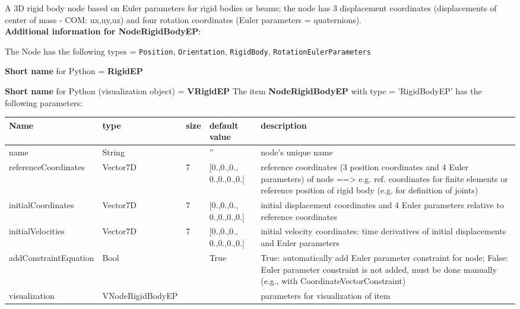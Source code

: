 \label{sec:item:NodeRigidBodyEP}
A 3D rigid body node based on Euler parameters for rigid bodies or beams; the node has 3 displacement coordinates (displacements of center of mass - COM: ux,uy,uz) and four rotation coordinates (Euler parameters = quaternions).\vspace{12pt}
 \\{\bf Additional information for NodeRigidBodyEP}:
\bi
  \item The Node has the following types = \texttt{Position}, \texttt{Orientation}, \texttt{RigidBody}, \texttt{RotationEulerParameters}
  \item {\bf Short name} for Python = {\bf RigidEP}  \item {\bf Short name} for Python (visualization object) = {\bf VRigidEP}\ei
\vspace{12pt} \noindent The item {\bf NodeRigidBodyEP} with type = 'RigidBodyEP' has the following parameters:\vspace{-1cm}\\ 
\begin{center}
  \footnotesize
  \begin{longtable}{| p{4.5cm} | p{2.5cm} | p{0.5cm} | p{2.5cm} | p{6cm} |}
    \hline
    \bf Name & \bf type & \bf size & \bf default value & \bf description \\ \hline
    name &     String &      &     '' &     node's unique name\\ \hline
    referenceCoordinates &     Vector7D &     7 &     [0.,0.,0., 0.,0.,0.,0.] &     reference coordinates (3 position coordinates and 4 Euler parameters) of node ==> e.g. ref. coordinates for finite elements or reference position of rigid body (e.g. for definition of joints)\\ \hline
    initialCoordinates &     Vector7D &     7 &     [0.,0.,0., 0.,0.,0.,0.] &     initial displacement coordinates and 4 Euler parameters relative to reference coordinates\\ \hline
    initialVelocities &     Vector7D &     7 &     [0.,0.,0., 0.,0.,0.,0.] &     initial velocity coordinates: time derivatives of initial displacements and Euler parameters\\ \hline
    addConstraintEquation &     Bool &      &     True &     True: automatically add Euler parameter constraint for node; False: Euler parameter constraint is not added, must be done manually (e.g., with CoordinateVectorConstraint)\\ \hline
    visualization & VNodeRigidBodyEP & & & parameters for visualization of item \\ \hline
	  \end{longtable}
	\end{center}
